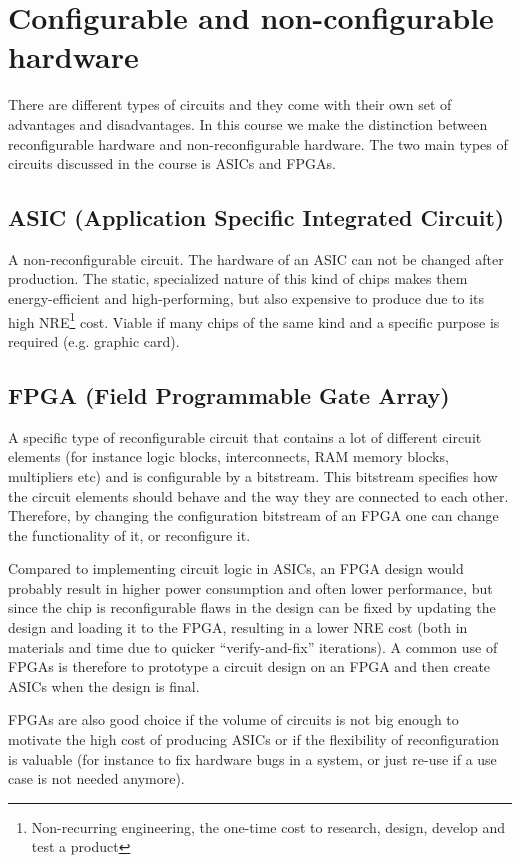 \documentclass[a4paper,11pt]{report}
\begin{document}
\section{Configurable and non-configurable hardware}
There are different types of circuits and they come with their own set
of advantages and disadvantages. In this course we make the
distinction between reconfigurable hardware and non-reconfigurable
hardware. The two main types of circuits discussed in the course is
ASICs and FPGAs.

\subsection{ASIC (Application Specific Integrated Circuit)}
A non-reconfigurable circuit. The hardware of an ASIC can not be
changed after production. The static, specialized nature of this kind
of chips makes them energy-efficient and high-performing, but also
expensive to produce due to its high NRE\footnote{Non-recurring
  engineering, the one-time cost to research, design, develop and test
  a product} cost. Viable if many chips of the same kind and a
specific purpose is required (e.g. graphic card).

\subsection{FPGA (Field Programmable Gate Array)}
A specific type of reconfigurable circuit that contains a lot of
different circuit elements (for instance logic blocks, interconnects,
RAM memory blocks, multipliers etc) and is configurable by a
bitstream. This bitstream specifies how the circuit elements should
behave and the way they are connected to each other. Therefore, by
changing the configuration bitstream of an FPGA one can change the
functionality of it, or reconfigure it.

Compared to implementing circuit logic in ASICs, an FPGA design would
probably result in higher power consumption and often lower
performance, but since the chip is reconfigurable flaws in the design
can be fixed by updating the design and loading it to the FPGA,
resulting in a lower NRE cost (both in materials and time due to
quicker ``verify-and-fix'' iterations). A common use of FPGAs is
therefore to prototype a circuit design on an FPGA and then create
ASICs when the design is final.

FPGAs are also good choice if the volume of circuits is not big enough
to motivate the high cost of producing ASICs or if the flexibility of
reconfiguration is valuable (for instance to fix hardware bugs in a
system, or just re-use if a use case is not needed anymore).
\end{document}

